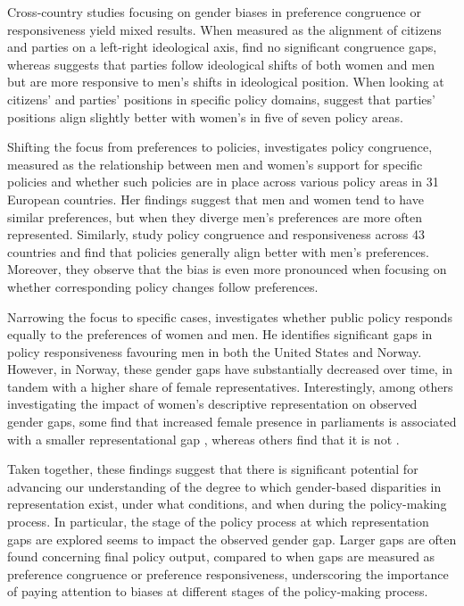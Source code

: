 Cross-country studies focusing on gender biases in preference congruence or responsiveness yield mixed results. When measured as the alignment of citizens and parties on a left-right ideological axis, \textcite{bernauer_mind_2015} find no significant congruence gaps, whereas \textcite{ferland_gender_2020} suggests that parties follow ideological shifts of both women and men but are more responsive to men's shifts in ideological position. When looking at citizens' and parties' positions in specific policy domains, \parencite{dingler_parliaments_2019} suggest that parties' positions align slightly better with women's in five of seven policy areas.  

Shifting the focus from preferences to policies, \textcite{reher_gender_2018} investigates policy congruence, measured as the relationship between men and women's support for specific policies and whether such policies are in place across various policy areas in 31 European countries. Her findings suggest that men and women tend to have similar preferences, but when they diverge men's preferences are more often represented. Similarly, \textcite{persson_mans_2023} study policy congruence and responsiveness across 43 countries and find that policies generally align better with men's preferences. Moreover, they observe that the bias is even more pronounced when focusing on whether corresponding policy changes follow preferences.

Narrowing the focus to specific cases, \textcite{mathisen_influence_2024} investigates whether public policy responds equally to the preferences of women and men. He identifies significant gaps in policy responsiveness favouring men in both the United States and Norway. However, in Norway, these gender gaps have substantially decreased over time, in tandem with a higher share of female representatives. Interestingly, among others investigating the impact of women's descriptive representation on observed gender gaps, some find that increased female presence in parliaments is associated with a smaller representational gap \parencite{bernauer_mind_2015, ferland_gender_2020}, whereas others find that it is not \parencite{reher_gender_2018, dingler_parliaments_2019, homola_are_2019}.

Taken together, these findings suggest that there is significant potential for advancing our understanding of the degree to which gender-based disparities in representation exist, under what conditions, and when during the policy-making process. In particular, the stage of the policy process at which representation gaps are explored seems to impact the observed gender gap. Larger gaps are often found concerning final policy output, compared to when gaps are measured as preference congruence or preference responsiveness, underscoring the importance of paying attention to biases at different stages of the policy-making process.  

